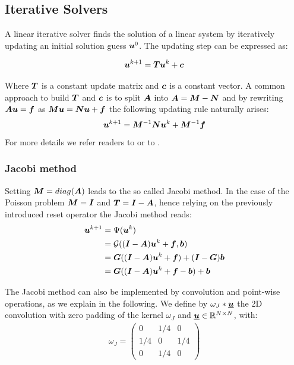 \subsection{Iterative Solvers}
A linear iterative solver finds the solution of a linear system by iteratively updating an initial solution guess ${\bm{u}}^0$.
The updating step can be expressed as:

\begin{equation*}
{\bm{u}}^{k+1} = {\bm{T}}{\bm{u}}^k + {\bm{c}}
\end{equation*}

Where ${\bm{T}}$ is a constant update matrix and ${\bm{c}}$ is a constant vector.
A common approach to build ${\bm{T}}$ and ${\bm{c}}$ is to split ${\bm{A}}$ into ${\bm{A}} = {\bm{M}}-{\bm{N}}$ and by rewriting ${\bm{A}}{\bm{u}}={\bm{f}}$ as ${\bm{M}}{\bm{u}}={\bm{N}}{\bm{u}} + {\bm{f}}$ the following updating rule naturally arises:
\begin{equation*}
{\bm{u}}^{k+1} = {\bm{M}}^{-1}{\bm{N}}{\bm{u}}^k + {\bm{M}}^{-1}{\bm{f}}
\end{equation*}
For more details we refer readers to \cite{leveque} or to \cite{original_paper}.

\subsubsection{Jacobi method}
Setting ${\bm{M}} = diag({\bm{A}})$ leads to the so called Jacobi method. In the case of the Poisson problem ${\bm{M}}={\bm{I}}$ and ${\bm{T}}={\bm{I}}-{\bm{A}}$, hence relying on the previously introduced reset operator the Jacobi method reads:
\begin{align*}
{\bm{u}}^{k+1} &= \Psi({\bm{u}}^k)\\
          &= \mathcal{G}(({\bm{I}}-{\bm{A}}){\bm{u}}^k + {\bm{f}}, {\bm{b}})\\
          &= {\bm{G}}(({\bm{I}}-{\bm{A}}){\bm{u}}^k + {\bm{f}}) + ({\bm{I}}-{\bm{G}}){\bm{b}}\\
          &= {\bm{G}}(({\bm{I}}-{\bm{A}}){\bm{u}}^k + {\bm{f}}-{\bm{b}}) + {\bm{b}}
\label{jacobiMatrix}
\end{align*}

The Jacobi method can also be implemented by convolution and point-wise operations, as we explain in the following. We define by $\omega_J \ast \underline{{\bm{u}}}$ the 2D convolution with zero padding of the kernel $\omega_J$ and $\underline{{\bm{u}}} \in {\mathbb{R}}^{N\times N}$, with:
\begin{align*}
\omega_{J} = \left (
 \begin{smallmatrix}
0 & 1/4 & 0 \\
1/4 & 0 & 1/4 \\
0 & 1/4 & 0
\end{smallmatrix}
\right )
\end{align*}

